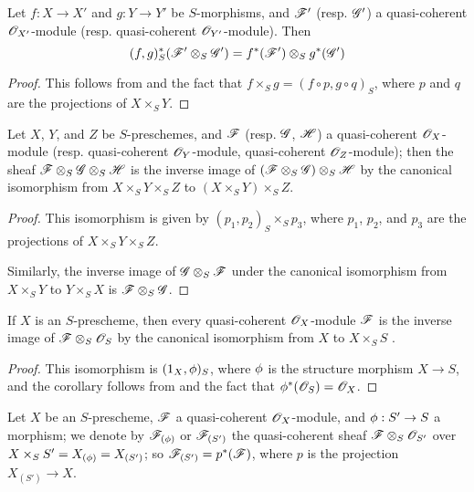 \begin{cor}[9.1.5]
\label{1.9.1.5}
Let $f:X\to X'$ and $g:Y\to Y'$ be
$S$-morphisms, and $\mathscr{F}'$ (resp. $\mathscr{G}'$) a quasi-coherent
$\mathscr{O}_{X'}$-module (resp. quasi-coherent $\mathscr{O}_{Y'}$-module). Then
\[
  (f,g)^*_S(\mathscr{F}'\otimes_S\mathscr{G}')=f^*(\mathscr{F}')\otimes_S g^*(\mathscr{G}')
\]
\end{cor}

\begin{proof}
\label{proof-1.9.1.5}
This follows from  and the fact that $f\times_S g=(f\circ p, g\circ q)_S$,
where $p$ and $q$ are the projections of $X\times_S Y$.
\end{proof}

\begin{cor}[9.1.6]
\label{1.9.1.6}
Let $X$, $Y$, and $Z$ be $S$-preschemes, and $\mathscr{F}$ (resp. $\mathscr{G}$, $\mathscr{H}$) a
quasi-coherent $\mathscr{O}_X$-module (resp. quasi-coherent $\mathscr{O}_Y$-module, quasi-coherent
$\mathscr{O}_Z$-module); then the sheaf $\mathscr{F}\otimes_S\mathscr{G}\otimes_S\mathscr{H}$ is the inverse image
of $(\mathscr{F}\otimes_S\mathscr{G})\otimes_S\mathscr{H}$ by the canonical isomorphism from
$X\times_S Y\times_S Z$ to $(X\times_S Y)\times_S Z$.
\end{cor}

\begin{proof}
\label{proof-1.9.16}
This isomorphism is given by $(p_1,p_2)_S\times_S p_3$, where $p_1$, $p_2$, and $p_3$
are the projections of $X\times_S Y\times_S Z$.

Similarly, the inverse image of $\mathscr{G}\otimes_S\mathscr{F}$ under the canonical isomorphism from
$X\times_S Y$ to $Y\times_S X$ is $\mathscr{F}\otimes_S\mathscr{G}$.
\end{proof}

\begin{cor}[9.1.7]
\label{1.9.1.7}
If $X$ is an $S$-prescheme, then every quasi-coherent $\mathscr{O}_X$-module $\mathscr{F}$ is the inverse
image of $\mathscr{F}\otimes_S\mathscr{O}_S$ by the canonical isomorphism from $X$ to $X\times_S S$
.
\end{cor}

\begin{proof}
\label{proof-1.9.1.7}
This isomorphism is $(1_X,\phi)_S$, where $\phi$ is the structure morphism
$X\to S$, and the corollary follows from  and the fact that
$\phi^*(\mathscr{O}_S)=\mathscr{O}_X$.
\end{proof}

\begin{env}[9.1.8]
\label{1.9.1.8}
Let $X$ be an $S$-prescheme, $\mathscr{F}$ a quasi-coherent
$\mathscr{O}_X$-module, and $\vphi:S'\to S$ a morphism; we denote by
$\mathscr{F}_{(\phi)}$ or $\mathscr{F}_{(S')}$ the quasi-coherent sheaf
$\mathscr{F}\otimes_S\mathscr{O}_{S'}$ over $X\times_S S'=X_{(\phi)}=X_{(S')}$; so
$\mathscr{F}_{(S')}=p^*(\mathscr{F})$, where $p$ is the projection $X_{(S')}\to X$.
\end{env}

